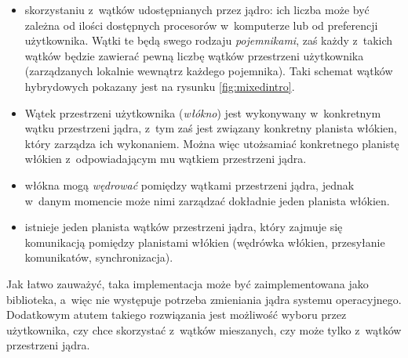 \documentclass[11pt,makeidx]{mwart}
\begin{document}
	\begin{itemize}
		\item skorzystaniu z~wątków udostępnianych przez jądro: ich liczba może być zależna od ilości dostępnych procesorów w~komputerze
			lub od preferencji użytkownika. Wątki te będą swego rodzaju \emph{pojemnikami}, zaś każdy z~takich wątków będzie zawierać pewną
			liczbę wątków przestrzeni użytkownika (zarządzanych lokalnie wewnątrz każdego pojemnika). Taki schemat wątków hybrydowych pokazany jest na
			rysunku \ref{fig:mixedintro}.
		\item Wątek przestrzeni użytkownika (\emph{włókno}) jest wykonywany w~konkretnym wątku przestrzeni jądra, z~tym zaś jest związany
			konkretny planista włókien, który zarządza ich wykonaniem. Można więc utożsamiać konkretnego planistę włókien z~odpowiadającym mu
			wątkiem przestrzeni jądra.
		\item włókna mogą \emph{wędrować} pomiędzy wątkami przestrzeni jądra, jednak w~danym momencie może nimi zarządzać dokładnie jeden
			planista włókien.
		\item istnieje jeden planista wątków przestrzeni jądra, który zajmuje się komunikacją pomiędzy planistami włókien (wędrówka włókien,
			przesyłanie komunikatów, synchronizacja).
	\end{itemize}
	Jak łatwo zauważyć, taka implementacja może być zaimplementowana jako biblioteka, a~więc nie występuje potrzeba zmieniania jądra systemu operacyjnego.
	Dodatkowym atutem takiego rozwiązania jest możliwość wyboru przez użytkownika, czy chce skorzystać z~wątków mieszanych, czy może tylko z~wątków
	przestrzeni jądra.
\par
%
\end{document}
